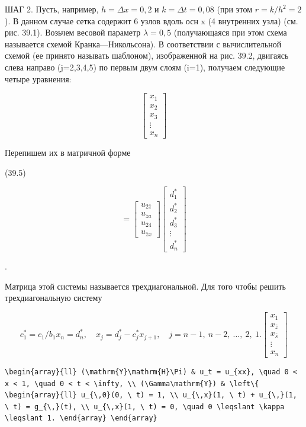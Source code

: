 \documentclass[
  ukrainian,
]{article}
\begin{document}
ШАГ 2. Пусть, например, \(h=\Delta x=0,2\) и \(k=\Delta t=0,08\) (при
этом \(r=k/h^2=2\) ). В данном случае сетка содержит 6 узлов вдоль осн x
(4 внутренних узла) (см. рис. 39.1). Возьчем весовой параметр
\(\lambda=0,5\) (получающаяся при этом схема называется схемой
Кранка---Никольсона). В соответствии с вычислительной схемой (ее принято
называть шаблоном), изображенной на рис. 39.2, двигаясь слева направо
(j=2,3,4,5) по первым двум слоям (i=1), получаем следующие четыре
уравнения:

\[
\begin{bmatrix} x_1 \\ x_2 \\ x_3 \\ \vdots \\ x_n \end{bmatrix}
\]

Перепишем их в матричной форме

(39.5)

\[
=
\begin{bmatrix} u_{2\bar{z}} \\ u_{\bar{z}a} \\ u_{24} \\ u_{\bar{z}x} \end{bmatrix}
\begin{bmatrix} d_1^* \\ d_2^* \\ d_3^* \\ \vdots \\ d_n^* \end{bmatrix}
\]

.

Матрица этой системы называется трехдиагональной. Для того чтобы решить
трехдиагональную систему

\[
c_1^* = c_1/b_1
x_n = d_n^*, \quad x_j = d_j^* - c_j^* x_{j+1}, \quad j = n-1, \ n-2, \ \dots, \ 2, \ 1.
\begin{bmatrix} x_1 \\ x_{\bar{z}} \\ x_{\bar{s}} \\ \vdots \\ x_n \end{bmatrix}
\]

\begin{verbatim}
\begin{array}{ll} (\mathrm{Y}\mathrm{H}\Pi) & u_t = u_{xx}, \quad 0 < x < 1, \quad 0 < t < \infty, \\ (\Gamma\mathrm{Y}) & \left\{ \begin{array}{ll} u_{\,0}(0, \ t) = 1, \\ u_{\,x}(1, \ t) + u_{\,}(1, \ t) = g_{\,}(t), \\ u_{\,x}(1, \ t) = 0, \quad 0 \leqslant \kappa \leqslant 1. \end{array} \end{array}
\end{verbatim}
\end{document}
